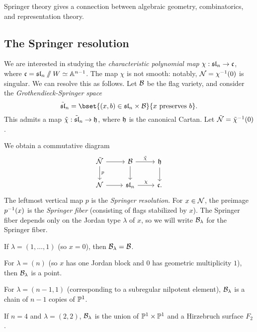 \documentclass{article}
\begin{document}
Springer theory gives a connection between algebraic geometry, combinatorics, and representation theory.

\subsection{The Springer resolution}

We are interested in studying the \emph{characteristic polynomial map} $\chi: \mathfrak{sl}_n \to \mathfrak{c}$, where $\mathfrak{c} = \mathfrak{sl}_n \mathbin{/\mkern-6mu/} W \simeq \mathbb{A}^{n-1}$.
The map $\chi$ is not smooth: notably, $\mathcal{N} = \chi^{-1}(0)$ is singular.
We can resolve this as follows.
Let $\mathcal{B}$ be the flag variety, and consider the \emph{Grothendieck-Springer space}
\[
	\tilde{\slfr}_n = \bset{(x, b) \in \slfr_n \times \Bc}{x \textrm{ preserves } b}.
\]
This admits a map $\tilde{\chi}: \tilde{\mathfrak{sl}}_n \to \mathfrak{h}$, where $\mathfrak{h}$ is the canonical Cartan.
Let $\tilde{\mathcal{N}} = \tilde{\chi}^{-1}(0)$.

We obtain a commutative diagram
\[
	\begin{tikzcd}
		\tilde{\Nc} \rar \dar["p"] & \Bc \rar["\tilde{\chi}"] \dar & \hfr \dar \\
		\Nc \rar & \slfr_n \rar["\chi"] & \cfr.
	\end{tikzcd}
\]
The leftmost vertical map $p$ is the \emph{Springer resolution}.
For $x \in \mathcal{N}$, the preimage $p^{-1}(x)$ is the \emph{Springer fiber} (consisting of flags stabilized by $x$).
The Springer fiber depends only on the Jordan type $\lambda$ of $x$, so we will write $\mathcal{B}_\lambda$ for the Springer fiber.

\begin{ex}
	If $\lambda = (1, \dots, 1)$ (so $x = 0$), then $\mathcal{B}_\lambda = \mathcal{B}$.
\end{ex}

\begin{ex}
	For $\lambda = (n)$ (so $x$ has one Jordan block and $0$ has geometric multiplicity $1$), then $\mathcal{B}_\lambda$ is a point.
\end{ex}

\begin{ex}
	For $\lambda = (n-1, 1)$ (corresponding to a subregular nilpotent element), $\mathcal{B}_\lambda$ is a chain of $n - 1$ copies of $\mathbb{P}^1$.
\end{ex}

\begin{ex}
	If $n = 4$ and $\lambda = (2, 2)$, $\mathcal{B}_\lambda$ is the union of $\mathbb{P}^1 \times \mathbb{P}^1$ and a Hirzebruch surface $F_2$.
\end{ex}
\end{document}
